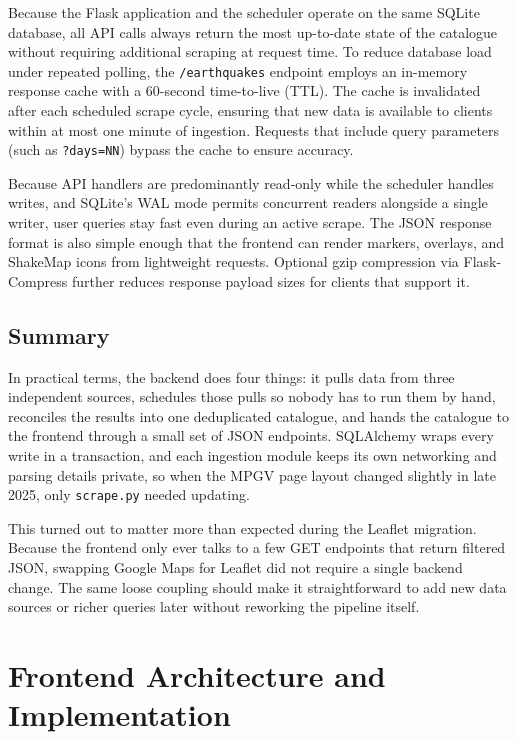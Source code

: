 \documentclass[12pt]{article}
\begin{document}
Because the Flask application and the scheduler operate on the same SQLite database, all API calls always return the most up-to-date state of the catalogue without requiring additional scraping at request time. To reduce database load under repeated polling, the \texttt{/earthquakes} endpoint employs an in-memory response cache with a 60-second time-to-live (TTL). The cache is invalidated after each scheduled scrape cycle, ensuring that new data is available to clients within at most one minute of ingestion. Requests that include query parameters (such as \texttt{?days=NN}) bypass the cache to ensure accuracy.

Because API handlers are predominantly read-only while the scheduler handles writes, and SQLite's WAL mode permits concurrent readers alongside a single writer, user queries stay fast even during an active scrape. The JSON response format is also simple enough that the frontend can render markers, overlays, and ShakeMap icons from lightweight requests. Optional gzip compression via Flask-Compress further reduces response payload sizes for clients that support it.

\subsection{Summary}

In practical terms, the backend does four things: it pulls data from three independent sources, schedules those pulls so nobody has to run them by hand, reconciles the results into one deduplicated catalogue, and hands the catalogue to the frontend through a small set of JSON endpoints. SQLAlchemy wraps every write in a transaction, and each ingestion module keeps its own networking and parsing details private, so when the MPGV page layout changed slightly in late 2025, only \texttt{scrape.py} needed updating.

This turned out to matter more than expected during the Leaflet migration. Because the frontend only ever talks to a few GET endpoints that return filtered JSON, swapping Google Maps for Leaflet did not require a single backend change. The same loose coupling should make it straightforward to add new data sources or richer queries later without reworking the pipeline itself.

\newpage

\section{Frontend Architecture and Implementation}
\label{sec:frontend}
\end{document}
